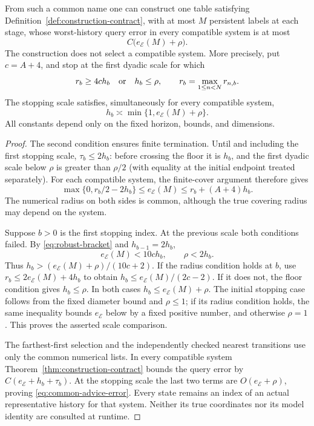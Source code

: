 \begin{theorem}\label{thm:common-advice}
From such a common name one can construct one table satisfying
Definition~\ref{def:construction-contract}, with at most $M$ persistent
labels at each stage, whose worst-history query error in every compatible
system is at most
\begin{equation}\label{eq:common-advice-error}
 C\bigl(e_{\mathcal E}(M)+\rho\bigr).
\end{equation}
The construction does not select a compatible system. More precisely,
put $c=A+4$, and stop at the first dyadic scale for which
\begin{equation}\label{eq:robust-stop}
 r_b\ge4c h_b\quad\hbox{or}\quad h_b\le\rho,
 \qquad r_b=\max_{1\le n<N}r_{n,b}.
\end{equation}
The stopping scale satisfies, simultaneously for every compatible system,
\[
 h_b\asymp\min\{1,e_{\mathcal E}(M)+\rho\}.
\]
All constants depend only on the fixed horizon, bounds, and dimensions.
\end{theorem}
\begin{proof}
The second condition ensures finite termination. Until and including the
first stopping scale, $\tau_b\le2h_b$: before crossing the floor it
is $h_b$, and the first dyadic scale below $\rho$ is greater than
$\rho/2$ (with equality at the initial endpoint treated separately).
For each compatible system, the finite-cover argument therefore gives
\begin{equation}\label{eq:robust-bracket}
 \max\{0,r_b/2-2h_b\}\le e_{\mathcal E}(M)
           \le r_b+(A+4)h_b.
\end{equation}
The numerical radius on both sides is common, although the true covering
radius may depend on the system.

Suppose $b>0$ is the first stopping index. At the previous scale both
conditions failed. By \eqref{eq:robust-bracket} and
$h_{b-1}=2h_b$,
\[
 e_{\mathcal E}(M)<10c h_b,\qquad \rho<2h_b.
\]
Thus $h_b>(e_{\mathcal E}(M)+\rho)/(10c+2)$.
If the radius condition holds at $b$, use
$r_b\le2e_{\mathcal E}(M)+4h_b$ to obtain
$h_b\le e_{\mathcal E}(M)/(2c-2)$.
If it does not, the floor condition gives $h_b\le\rho$.
In both cases $h_b\le e_{\mathcal E}(M)+\rho$.
The initial stopping case follows from the fixed diameter bound and
$\rho\le1$; if its radius condition holds, the same inequality bounds
$e_{\mathcal E}$ below by a fixed positive number, and otherwise
$\rho=1$. This proves the asserted scale comparison.

The farthest-first selection and the independently checked nearest
transitions use only the common numerical lists. In every compatible
system Theorem~\ref{thm:construction-contract} bounds the query error
by $C(e_{\mathcal E}+h_b+\tau_b)$. At the stopping scale the last
two terms are $O(e_{\mathcal E}+\rho)$, proving
\eqref{eq:common-advice-error}. Every state remains an index of an
actual representative history for that system. Neither its true
coordinates nor its model identity are consulted at runtime.
\end{proof}

